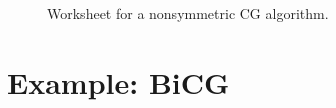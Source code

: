 \begin{figure}
\centering
\begin{minipage}[t]{4.5in}
	\resetsteps
	
	\renewcommand{\ALGroutinename}{ nonsymmetric CG}
	
	\renewcommand{\WSprecondition}{}
	
	\renewcommand{\WSpartition}{
        $
        R \rightarrow
		\myFlaOneByThreeI{R_L}{r_R}{r_+}
	$
        }

	\renewcommand{\WSpartitionsizes}{
		$ R_{L} $ is $ n \times 0 $
	}
	
	\renewcommand{\WSpreprocessing}{
		$p_R := r_R$
	}
	
	\renewcommand{\WSguard}{ $\| r_R \| \geq \varepsilon$ }
	
	
	\renewcommand{\WSrepartition}{
	$\myFlaOneByThreeI{R_L}{r_R}{r_+} \rightarrow \myFlaOneByThreeI{R_0}{r_1}{r_2}$
	}
	
	\renewcommand{\WSrepartitionsizes}{
	$A$ is $k \times k$
	}

	
	\renewcommand{\WSupdate}{
		$\begin{aligned}
		t_1 &:= A p_1 \\
		\delta_{11} &:= \frac{r_1^T r_1}{r_1^T t_1} \\
		r_2 &:= r_1 - t_1 \delta_{11} \\
		x_2 &:= x_1 - p_1 \delta_{11} \\
		t_2 &:= A r_2 \\
		u_{02} &:= \left(- P_0^T A P_0 \right)^{-1} \cdot P_0^T t_2 \\
		t_3 &:= P_0 u_{02} \\
		\nu_{12} &:= - \frac{p_1^T t_2 + p_1^T A t_3}{p_1^T t_1} \\
		p_2 &:= r_2 + t_3 + p_1 \nu_{12}
		\end{aligned}$
	}
	
	\renewcommand{\WSmoveboundary}{
	$\myFlaOneByThreeI{R_L}{r_R}{r_+} \leftarrow \myFlaOneByFourTFF{R_0}{r_1}{r_2}{r_3}$
	}
	
	\renewcommand{\WSpostcondition}{
	
	}
	
	{
	\FlaAlgorithmIter
	}
\end{minipage}
\caption{Worksheet for a nonsymmetric CG algorithm.}
\label{fig:ws:nonsymCG}
\end{figure}
%
\section{Example: BiCG}
\label{sec:BiCGexample}

